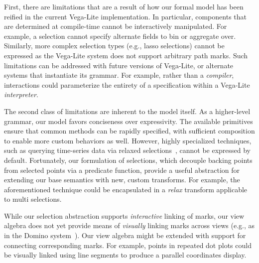 First, there are limitations that are a result of how our formal model has been
reified in the current Vega-Lite implementation. In particular, components that
are determined at compile-time cannot be interactively manipulated. For example,
a selection cannot specify alternate fields to bin or aggregate over. Similarly,
more complex selection types (e.g., lasso selections) cannot be expressed as the
Vega-Lite system does not support arbitrary path marks. Such limitations can be
addressed with future versions of Vega-Lite, or alternate systems that
instantiate its grammar. For example, rather than a \emph{compiler},
interactions could parameterize the entirety of a specification within a
Vega-Lite \emph{interpreter}.

The second class of limitations are inherent to the model itself. As a
higher-level grammar, our model favors conciseness over expressivity. The
available primitives ensure that common methods can be rapidly specified, with
sufficient composition to enable more custom behaviors as well. However, highly
specialized techniques, such as querying time-series data via relaxed
selections~\cite{holz:relaxed}, cannot be expressed by default. Fortunately, our
formulation of selections, which decouple backing points from selected points
via a predicate function, provide a useful abstraction for extending our base
semantics with new, custom transforms. For example, the aforementioned technique
could be encapsulated in a \emph{relax} transform applicable to multi
selections.

While our selection abstraction supports \emph{interactive} linking of marks,
our view algebra does not yet provide means of \emph{visually} linking marks
across views (e.g., as in the Domino system~\cite{gratzl:domino}). Our view
algebra might be extended with support for connecting corresponding marks. For
example, points in repeated dot plots could be visually linked using line
segments to produce a parallel coordinates display.